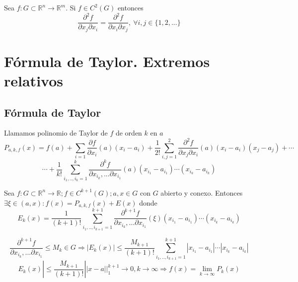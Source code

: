 \begin{theo}
Sea $f:G\subset\mathbb{R}^n\rightarrow\mathbb{R}^m$. Si $f\in C^2(G)$ entonces \[ \frac{\partial^2 f}{\partial x_j \partial x_i} = \frac{\partial^2 f}{\partial x_i \partial x_j}, \ \forall i,j \in\{1,2,...\} \]
\end{theo}

\chapter{Fórmula de Taylor. Extremos relativos}

\section{Fórmula de Taylor}

\begin{defn}
Llamamos polinomio de Taylor de $f$ de orden $k$ en $a$  \[P_{a,k,f}(x) = f(a) + \sum_{i=1} \frac{\partial f}{\partial x_i}(a)(x_i - a_i) + \frac{1}{2!}\sum^2_{i,j=1} \frac{\partial^2 f}{\partial x_j\partial x_i}(a)(x_i - a_i)(x_j - a_j) + \cdots \]  \[ \cdots + \frac{1}{k!}\sum^k_{i_1,..,i_k=1} \frac{\partial^k f}{\partial x_{i_k}, ... \partial x_{i_1}}(a)(x_{i_1} - a_{i_1})\cdots(x_{i_k} - a_{i_k})\] 
\end{defn}

\begin{theo}[de Taylor]
Sea $f:G\subset\mathbb{R}^n\rightarrow\mathbb{R}; f\in C^{k+1}(G); a,x\in G$ con $G$ abierto y conexo. Entonces $\exists\xi\in(a,x): f(x) = P_{a,k,f}(x) + E(x)$ donde \[ E_k(x) = \frac{1}{(k+1)!}\sum^{k+1}_{i_1,..,i_{k+1}=1} \frac{\partial^{k+1} f}{\partial x_{i_k}, ... \partial x_{i_1}}(\xi)(x_{i_1} - a_{i_1})\cdots(x_{i_k} - a_{i_k}) \]
\end{theo}

\begin{dem}

\end{dem}

\begin{cons}
\[ \frac{\partial^{k+1} f}{\partial x_{i_k}, ... \partial x_{i_1}} \leq M_k \in G \Rightarrow |E_k(x)| \leq \frac{M_{k+1}}{(k+1)!} \sum^{k+1}_{i_1,..,i_{k+1}=1} |x_{i_1} - a_{i_1}|\cdots|x_{i_k} - a_{i_k}|\] \[ E_k(x)| \leq \frac{M_{k+1}}{(k+1)!} ||x-a||_1^{k+1} \rightarrow 0, k\rightarrow \infty \Rightarrow f(x) = \lim_{k\rightarrow\infty} P_k(x) \]
\end{cons}


